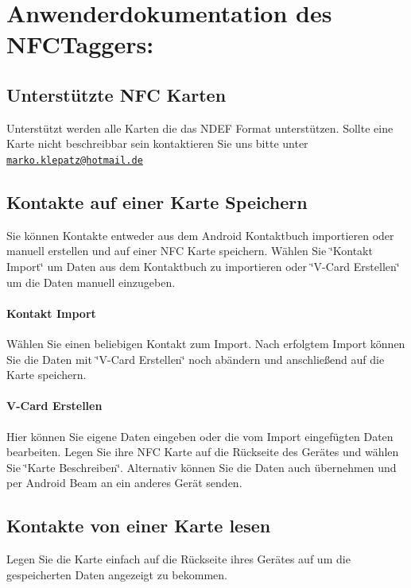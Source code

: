 \documentclass[a4paper,ngerman,12pt]{scrreprt}
\newcommand{\+}{\discretionary{\mbox{\scriptsize$\hookleftarrow$}}{}{}}
\begin{document}
\chapter{Anwenderdokumentation des N\+F\+C\+Taggers\+:}
\section{Unterstützte N\+FC Karten}

Unterstützt werden alle Karten die das N\+D\+EF Format unterstützen. Sollte eine Karte nicht beschreibbar sein kontaktieren Sie uns bitte unter \href{mailto:marko.klepatz@hotmail.de}{\tt marko.\+klepatz@hotmail.\+de}

\section{Kontakte auf einer Karte Speichern}

Sie können Kontakte entweder aus dem Android Kontaktbuch importieren oder manuell erstellen und auf einer N\+FC Karte speichern. Wählen Sie \char`\"{}\+Kontakt Import\char`\"{} um Daten aus dem Kontaktbuch zu importieren oder \char`\"{}\+V-\/\+Card Erstellen\char`\"{} um die Daten manuell einzugeben.

\subsubsection{Kontakt Import}

Wählen Sie einen beliebigen Kontakt zum Import. Nach erfolgtem Import können Sie die Daten mit \char`\"{}\+V-\/\+Card Erstellen\char`\"{} noch abändern und anschließend auf die Karte speichern.

\subsubsection{V-\/\+Card Erstellen}

Hier können Sie eigene Daten eingeben oder die vom Import eingefügten Daten bearbeiten. Legen Sie ihre N\+FC Karte auf die Rückseite des Gerätes und wählen Sie \char`\"{}\+Karte Beschreiben\char`\"{}. Alternativ können Sie die Daten auch übernehmen und per Android Beam an ein anderes Gerät senden.

\section{Kontakte von einer Karte lesen}

Legen Sie die Karte einfach auf die Rückseite ihres Gerätes auf um die gespeicherten Daten angezeigt zu bekommen. 
\end{document}
